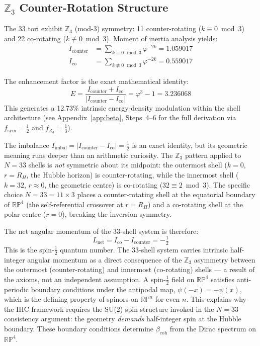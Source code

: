 \documentclass[12pt,a4paper]{article}
\begin{document}
\subsection{\texorpdfstring{$\mathbb{Z}_3$}{Z3} Counter-Rotation Structure}
\label{sec:z3}

The 33 tori exhibit $\mathbb{Z}_3$ (mod-3) symmetry: 11 counter-rotating
($k \equiv 0 \bmod 3$) and 22 co-rotating ($k \not\equiv 0 \bmod 3$). Moment of
inertia analysis yields:
\begin{align}
  I_\mathrm{counter} &= \sum_{k \equiv 0\,\bmod 3} \varphi^{-2k} = 1.059017 \\
  I_\mathrm{co} &= \sum_{k \not\equiv 0\,\bmod 3} \varphi^{-2k} = 0.559017
\end{align}

The enhancement factor is the exact mathematical identity:
\begin{equation}
  E = \frac{I_\mathrm{counter} + I_\mathrm{co}}{|I_\mathrm{counter} - I_\mathrm{co}|}
  = \varphi^3 - 1 = 3.236068
\end{equation}
This generates a 12.73\% intrinsic energy-density modulation within the shell architecture (see Appendix~\ref{app:beta}, Steps~4--6 for the full derivation via $f_\mathrm{sym}=\tfrac{1}{2}$ and $f_{Z_3}=\tfrac{1}{3}$).

The imbalance $I_\mathrm{imbal} = |I_\mathrm{counter} - I_\mathrm{co}| = \tfrac{1}{2}$
is an exact identity, but its geometric meaning runs deeper than an arithmetic curiosity.
The $\mathbb{Z}_3$ pattern applied to $N = 33$ shells is \emph{not} symmetric about its
midpoint: the outermost shell ($k = 0$, $r = R_H$, the Hubble horizon) is
counter-rotating, while the innermost shell ($k = 32$, $r \approx 0$, the geometric
centre) is co-rotating ($32 \equiv 2 \bmod 3$). The specific
choice $N = 33 = 11 \times 3$ places a counter-rotating shell at the equatorial
boundary of $\mathbb{RP}^4$ (the self-referential crossover at $r = R_H$) and a
co-rotating shell at the polar centre ($r = 0$), breaking the inversion symmetry.

The net angular momentum of the 33-shell system is therefore:
\begin{equation}
  L_\mathrm{net} = I_\mathrm{co} - I_\mathrm{counter} = -\tfrac{1}{2}
\end{equation}
This is the spin-$\tfrac{1}{2}$ quantum number. The 33-shell system carries intrinsic
half-integer angular momentum as a direct consequence of the $\mathbb{Z}_3$ asymmetry
between the outermost (counter-rotating) and innermost (co-rotating) shells ---
a result of the axioms, not an independent assumption. A spin-$\tfrac{1}{2}$ field on $\mathbb{RP}^4$ satisfies
anti-periodic boundary conditions under the antipodal map, $\psi(-x) = -\psi(x)$,
which is the defining property of spinors on $\mathbb{RP}^n$ for even $n$. This
explains why the IHC framework requires the SU(2) spin structure invoked in
the $N = 33$ consistency argument: the geometry \emph{demands} half-integer
spin at the Hubble boundary. These boundary conditions determine $\beta_\mathrm{coh}$
from the Dirac spectrum on $\mathbb{RP}^4$.
\end{document}
